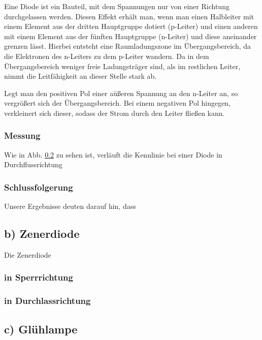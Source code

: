 \documentclass[11pt,a4paper,titlepage, ngerman]{article}
\begin{document}
				Eine Diode ist ein Bauteil, mit dem Spannungen nur von einer Richtung durchgelassen werden. Diesen Effekt erhält man, wenn man einen Halbleiter mit einem Element aus der dritten Hauptgruppe dotiert (p-Leiter) und einen anderen mit einem Element aus der fünften Hauptgruppe (n-Leiter) und diese aneinander grenzen lässt. Hierbei entsteht eine Raumladungszone im Übergangsbereich, da die Elektronen des n-Leiters zu dem p-Leiter wandern. Da in dem Übergangsbereich weniger freie Ladungsträger sind, als im restlichen Leiter, nimmt die Leitfähigkeit an dieser Stelle stark ab.
				
				Legt man den positiven Pol einer aüßeren Spannung an den n-Leiter an, so vergrößert sich der Übergangsbereich. Bei einem negativen Pol hingegen, verkleinert sich dieser, sodass der Strom durch den Leiter fließen kann. 
			
			\subsubsection{Messung}
				
				Wie in Abb. \ref{} zu sehen ist, verläuft die Kennlinie bei einer Diode in Durchflussrichtung %
			
			\subsubsection{Schlussfolgerung}
			
				Unsere Ergebnisse deuten darauf hin, dass %
				
		\subsection{b) Zenerdiode} %
			
			Die Zenerdiode
			
			\subsubsection{in Sperrrichtung}
			
			\subsubsection{in Durchlassrichtung}
			
		\subsection{c) Glühlampe} %
\end{document}
